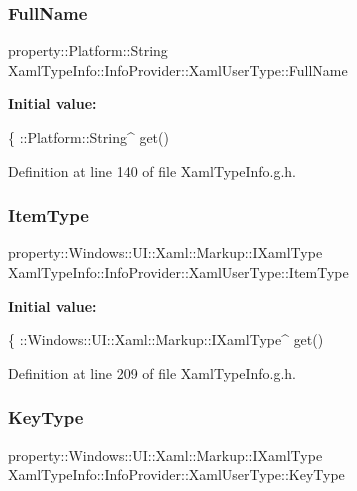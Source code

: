 \subsubsection{\texorpdfstring{Full\+Name}{FullName}}
{\footnotesize\ttfamily property\+::\+Platform\+::\+String Xaml\+Type\+Info\+::\+Info\+Provider\+::\+Xaml\+User\+Type\+::\+Full\+Name}

{\bfseries Initial value\+:}
\begin{DoxyCode}
\{
                ::Platform::String^ \textcolor{keyword}{get}()
\end{DoxyCode}


Definition at line 140 of file Xaml\+Type\+Info.\+g.\+h.

\mbox{\label{class_xaml_type_info_1_1_info_provider_1_1_xaml_user_type_a59724917c3bbf71f7c641d4b9d4b7cb6}} 
\subsubsection{\texorpdfstring{Item\+Type}{ItemType}}
{\footnotesize\ttfamily property\+::\+Windows\+::\+U\+I\+::\+Xaml\+::\+Markup\+::\+I\+Xaml\+Type Xaml\+Type\+Info\+::\+Info\+Provider\+::\+Xaml\+User\+Type\+::\+Item\+Type}

{\bfseries Initial value\+:}
\begin{DoxyCode}
\{ 
                ::Windows::UI::Xaml::Markup::IXamlType^ \textcolor{keyword}{get}()
\end{DoxyCode}


Definition at line 209 of file Xaml\+Type\+Info.\+g.\+h.

\mbox{\label{class_xaml_type_info_1_1_info_provider_1_1_xaml_user_type_a2afcdd6aa7f0f45728c5d4ef0e0d25f5}} 
\subsubsection{\texorpdfstring{Key\+Type}{KeyType}}
{\footnotesize\ttfamily property\+::\+Windows\+::\+U\+I\+::\+Xaml\+::\+Markup\+::\+I\+Xaml\+Type Xaml\+Type\+Info\+::\+Info\+Provider\+::\+Xaml\+User\+Type\+::\+Key\+Type}

